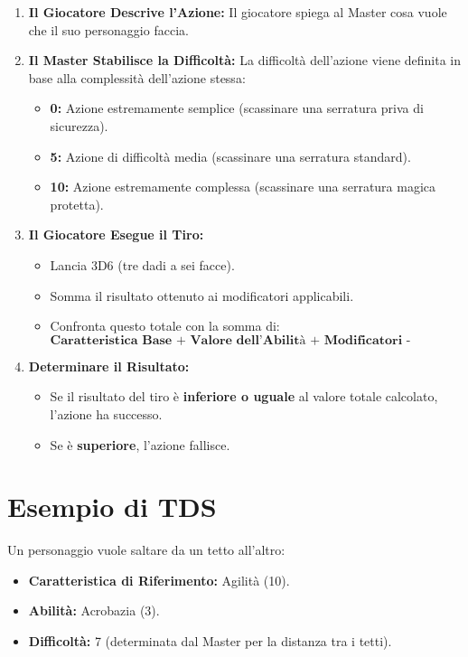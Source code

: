 \documentclass[../manuale_main.tex]{subfiles}
\begin{document}
\begin{enumerate}
 \item \textbf{Il Giocatore Descrive l'Azione:} Il giocatore spiega al Master cosa vuole che il suo personaggio faccia.
 
 \item \textbf{Il Master Stabilisce la Difficoltà:} La difficoltà dell'azione viene definita in base alla complessità dell'azione stessa:
 \begin{itemize}
 \item \textbf{0:} Azione estremamente semplice (scassinare una serratura priva di sicurezza).
 \item \textbf{5:} Azione di difficoltà media (scassinare una serratura standard).
 \item \textbf{10:} Azione estremamente complessa (scassinare una serratura magica protetta).
 \end{itemize}
 
 \item \textbf{Il Giocatore Esegue il Tiro:} 
 \begin{itemize}
 \item Lancia 3D6 (tre dadi a sei facce).
 \item Somma il risultato ottenuto ai modificatori applicabili.
 \item Confronta questo totale con la somma di:
 \[
 \textbf{Caratteristica Base + Valore dell’Abilità + Modificatori - Difficoltà}
 \]
 \end{itemize}
 
 \item \textbf{Determinare il Risultato:} 
 \begin{itemize}
 \item Se il risultato del tiro è \textbf{inferiore o uguale} al valore totale calcolato, l'azione ha successo.
 \item Se è \textbf{superiore}, l'azione fallisce.
 \end{itemize}
\end{enumerate}

\vspace{0.3cm}

\section*{Esempio di TDS}
Un personaggio vuole saltare da un tetto all'altro:

\begin{itemize}
 \item \textbf{Caratteristica di Riferimento:} Agilità (10).
 \item \textbf{Abilità:} Acrobazia (3).
 \item \textbf{Difficoltà:} 7 (determinata dal Master per la distanza tra i tetti).
\end{itemize}
\end{document}
